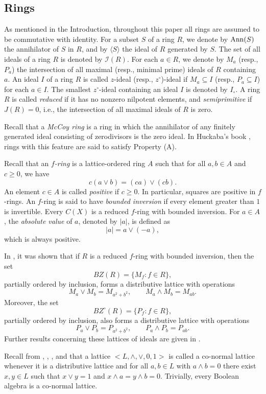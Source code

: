 \documentclass{amsart}
\theoremstyle{definition}
\theoremstyle{remark}
\numberwithin{equation}{section}
\newcommand{\Ann}{{\rm Ann}}
\theoremstyle{definition}\newtheorem{thm}{Theorem}[section]
\theoremstyle{definition}\newtheorem{cor}[thm]{Corollary}
\theoremstyle{definition}\newtheorem{lem}[thm]{Lemma}
\theoremstyle{definition}\newtheorem{prop}[thm]{Proposition}
\theoremstyle{definition}\newtheorem{defn}[thm]{Definition}
\theoremstyle{definition}\newtheorem{Rem}[thm]{Remark}
\theoremstyle{remark}\newtheorem{rem}[thm]{Remark}
\theoremstyle{definition}\newtheorem{exam}[thm]{Example}
\theoremstyle{definition}\newtheorem{qu}[thm]{question}
\begin{document}
\subsection{Rings} 
As mentioned in the Introduction, throughout this paper all rings are assumed to be commutative with identity. For a subset $S$ of a ring $R$, we denote by $\Ann(S)$ the annihilator of $S$ in $R$, and by $\langle S \rangle$ the ideal of $R$ generated by $S$. The set of all ideals of a ring $R$ is denoted by $\mathcal{I}(R)$. For each $a \in R$, we denote by $M_a$ (resp., $P_a$) the intersection of all maximal (resp., minimal prime) ideals of $R$ containing $a$. An ideal $I$ of a ring $R$ is called $z$-ideal (resp., $z^{\circ}$)-ideal if $M_a\subseteq I$ (resp., $P_a\subseteq I$) for each $a\in I$. The smallest $z^{\circ}$-ideal containing an ideal $I$ is denoted by $I_{\circ}$.  A ring $R$ is called \emph{reduced} if it has no nonzero nilpotent elements, and \emph{semiprimitive} if $J(R)=0$, i.e., the intersection of all maximal ideals of $R$ is zero. 

Recall that a \emph{McCoy ring} is a ring in which the annihilator of any finitely generated ideal consisting  of zerodivisors is the zero ideal.  In Huckaba's book \cite{Huc}, rings with this feature are said to satisfy Property (A). 

Recall that an \emph{$f$-ring} is a lattice-ordered ring $A$ such that for all $a,b \in A$ and $c \geq 0$, we have
\[
c(a \vee b) = (ca) \vee (cb).
\]
An element $c \in A$ is called \emph{positive} if $c \geq 0$. In particular, squares are positive in $f$-rings. An $f$-ring is said to have \emph{bounded inversion} if every element greater than $1$ is invertible. Every   $C(X)$ is a reduced $f$-ring with bounded inversion. For $a \in A$, the \emph{absolute value} of $a$, denoted by $\lvert a \rvert$, is defined as 
\[
\lvert a \rvert = a \vee (-a),
\]
which is always positive. 

In \cite{T}, it was shown that if $R$ is a reduced $f$-ring with bounded inversion, then the set 
\[
BZ(R) = \{M_f : f \in R\},
\]
partially ordered by inclusion, forms a distributive lattice with operations
\[
M_a \vee M_b = M_{a^2+b^2}, \qquad M_a \wedge M_b = M_{ab}.
\]
Moreover, the set 
\[
BZ^{\circ}(R) = \{P_f : f \in R\},
\]
partially ordered by inclusion, also forms a distributive lattice with operations
\[
P_a \vee P_b = P_{a^2+b^2}, \qquad P_a \wedge P_b = P_{ab}.
\]
Further results concerning these lattices of ideals are given in \cite{TA, T1}.

Recall from   \cite{AT}, \cite{BB1}, \cite{C}, and \cite{TA}  that a lattice $<L, \wedge, \vee, 0, 1>$ is called a co-normal lattice whenever it is a distributive lattice and for all $a, b\in L$ with $a\wedge b=0$ there exist $x, y\in L$ such that $x\vee y=1$ and $x\wedge a=y\wedge b=0$.  Trivially, every Boolean algebra is a co-normal lattice.
\end{document}
